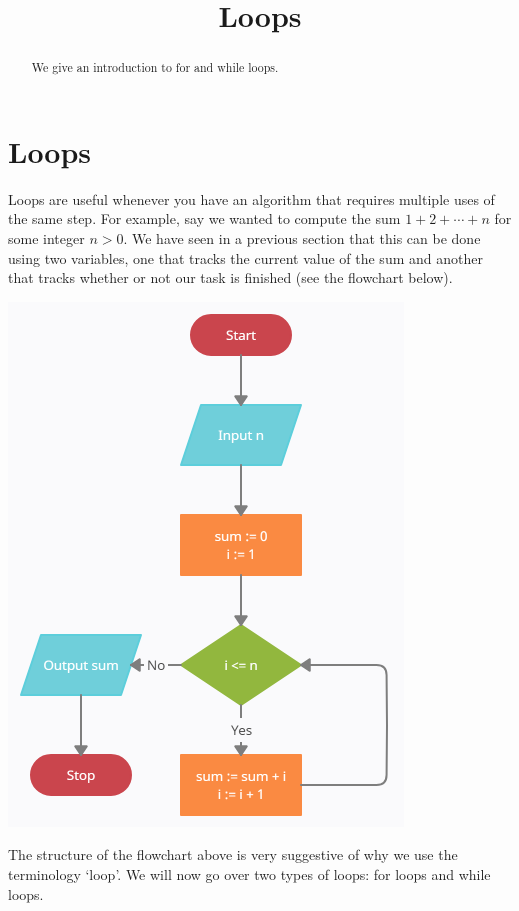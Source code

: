 \documentclass{ximera}
\title{Loops}
\begin{document}
  
\begin{abstract}  
We give an introduction to for and while loops.
\end{abstract}  
\maketitle

\section{Loops}

Loops are useful whenever you have an algorithm that requires multiple uses of the same step. For example, say we wanted to compute the sum $1+2+\cdots+n$ for some integer $n>0$. We have seen in a previous section that this can be done using two variables, one that tracks the current value of the sum and another that tracks whether or not our task is finished (see the flowchart below).

\begin{center}
	    \includegraphics{gausssum.png}
\end{center}

The structure of the flowchart above is very suggestive of why we use the terminology `loop'. We will now go over two types of loops: for loops and while loops.
\end{document}
